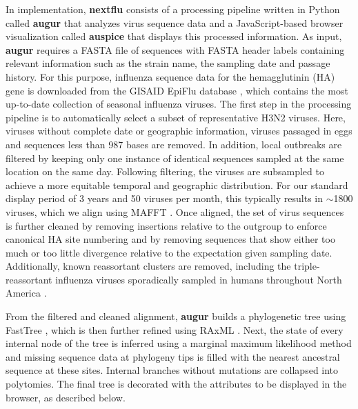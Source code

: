 \documentclass{bioinfo}
\newcommand{\augur}{\textbf{augur}}
\newcommand{\auspice}{\textbf{auspice}}
\newcommand{\nextflu}{\textbf{nextflu}}
\begin{document}
In implementation, \nextflu{} consists of a processing pipeline written in Python called \augur{} that analyzes virus sequence data and a JavaScript-based browser visualization called \auspice{} that displays this processed information.
As input, \augur{} requires a FASTA file of sequences with FASTA header labels containing relevant information such as the strain name, the sampling date and passage history.
For this purpose, influenza sequence data for the hemagglutinin (HA) gene is downloaded from the GISAID EpiFlu database \citep{GISAID}, which contains the most up-to-date collection of seasonal influenza viruses.
The first step in the processing pipeline is to automatically select a subset of representative H3N2 viruses.
Here, viruses without complete date or geographic information, viruses passaged in eggs and sequences less than 987 bases are removed.
In addition, local outbreaks are filtered by keeping only one instance of identical sequences sampled at the same location on the same day.
Following filtering, the viruses are subsampled to achieve a more equitable temporal and geographic distribution.
For our standard display period of 3 years and 50 viruses per month, this typically results in $\sim$1800 viruses, which we align using MAFFT \citep{katoh_mafft_2013}.
Once aligned, the set of virus sequences is further cleaned by removing insertions relative to the outgroup to enforce canonical HA site numbering and by removing sequences that show either too much or too little divergence relative to the expectation given sampling date.
Additionally, known reassortant clusters are removed, including the triple-reassortant influenza viruses sporadically sampled in humans throughout North America \citep{bastien_human_2010}.

From the filtered and cleaned alignment, \augur{} builds a phylogenetic tree using FastTree \citep{price_fasttree_2009}, which is then further refined using RAxML \citep{stamatakis_raxml_2014}.
Next, the state of every internal node of the tree is inferred using a marginal maximum likelihood method and missing sequence data at phylogeny tips is filled with the nearest ancestral sequence at these sites.
Internal branches without mutations are collapsed into polytomies.
The final tree is decorated with the attributes to be displayed in the browser, as described below.  
\end{document}
